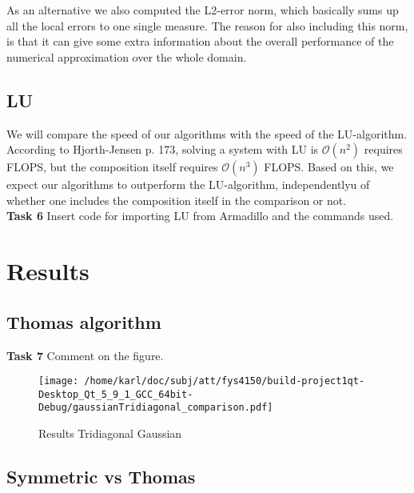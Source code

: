 \documentclass{article}
\begin{document}
As an alternative we also computed the L2-error norm, which basically sums up all the local errors to one single measure. The reason for also including this norm, is that it can give some extra information about the overall performance of the numerical approximation over the whole domain.

\subsection{LU}
We will compare the speed of our algorithms with the speed of the LU-algorithm. According to Hjorth-Jensen \cite{MHJ} p. 173, solving a system with LU is $\mathcal{O}(n^2)$ requires FLOPS, but the composition itself requires  $\mathcal{O}(n^3)$ FLOPS. Based on this, we expect our algorithms to outperform the LU-algorithm, independentlyu of whether one includes the composition itself in the comparison or not.\\

\textbf{Task 6} Insert code for importing LU from Armadillo and the commands used.

\section{Results}

\subsection{Thomas algorithm}
\textbf{Task 7} Comment on the figure.

\begin{figure}[H]
	\centering
	\texttt{[image: /home/karl/doc/subj/att/fys4150/build-project1qt-Desktop\_Qt\_5\_9\_1\_GCC\_64bit-Debug/gaussianTridiagonal\_comparison.pdf]}
	\caption{Results Tridiagonal Gaussian}
\end{figure}

\subsection{Symmetric vs Thomas}


\begin{minipage}{.49\textwidth} %
	
\end{minipage}\hfill
\begin{minipage}{.49\textwidth}
	
\end{minipage}\hfill
\end{document}
